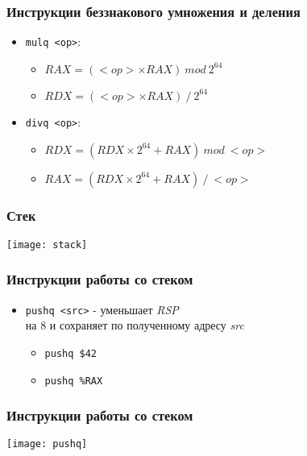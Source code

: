 \begin{frame}[fragile]
\frametitle{Инструкции беззнакового умножения и деления}
\begin{itemize}
    \item<1->\lstinline|mulq <op>|:
    \begin{itemize}
        \item<2->$RAX = (<op> \times RAX)~mod~2^{64}$
        \item<3->$RDX = (<op> \times RAX)~/~2^{64}$
    \end{itemize}
    \item<4->\lstinline|divq <op>|:
    \begin{itemize}
        \item$RDX = (RDX \times 2^{64} + RAX)~mod~<op>$
        \item$RAX = (RDX \times 2^{64} + RAX)~/~<op>$
    \end{itemize}
\end{itemize}
\end{frame}

\begin{frame}
\frametitle{Стек}
    \hspace*{\fill}
    \texttt{[image: stack]}
    \hspace*{\fill}\hspace*{\fill}
\end{frame}

\begin{frame}[fragile]
\frametitle{Инструкции работы со стеком}
\begin{itemize}
    \item<1->\lstinline|pushq <src>| - уменьшает \emph{RSP}\\
    на 8 и сохраняет по полученному адресу \emph{src}
    \begin{itemize}
        \item<2->\lstinline|pushq $42|
        \item<3->\lstinline|pushq %RAX|
    \end{itemize}
\end{itemize}
\end{frame}

\begin{frame}
\frametitle{Инструкции работы со стеком}
    \hspace*{\fill}
    \texttt{[image: pushq]}
    \hspace*{\fill}\hspace*{\fill}
\end{frame}

